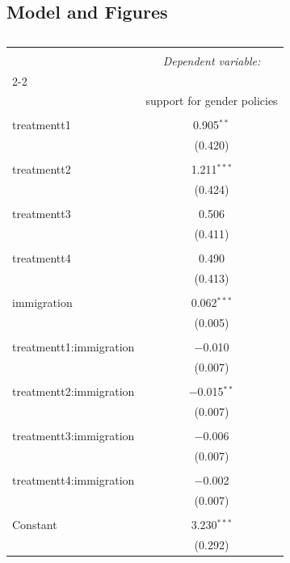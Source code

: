 \documentclass[12pt,letterpaper]{article}
\begin{document}
		\subsection*{Model and Figures}
		\begin{table}[!htbp] \centering 
			\caption{} 
			\label{} 
			\begin{tabular}{@{\extracolsep{5pt}}lc} 
				\\[-1.8ex]\hline 
				\hline \\[-1.8ex] 
				& \multicolumn{1}{c}{\textit{Dependent variable:}} \\ 
				\cline{2-2} 
				\\[-1.8ex] & support for gender policies \\ 
				\hline \\[-1.8ex] 
				treatmentt1 & 0.905$^{**}$ \\ 
				& (0.420) \\ 
				& \\ 
				treatmentt2 & 1.211$^{***}$ \\ 
				& (0.424) \\ 
				& \\ 
				treatmentt3 & 0.506 \\ 
				& (0.411) \\ 
				& \\ 
				treatmentt4 & 0.490 \\ 
				& (0.413) \\ 
				& \\ 
				immigration & 0.062$^{***}$ \\ 
				& (0.005) \\ 
				& \\ 
				treatmentt1:immigration & $-$0.010 \\ 
				& (0.007) \\ 
				& \\ 
				treatmentt2:immigration & $-$0.015$^{**}$ \\ 
				& (0.007) \\ 
				& \\ 
				treatmentt3:immigration & $-$0.006 \\ 
				& (0.007) \\ 
				& \\ 
				treatmentt4:immigration & $-$0.002 \\ 
				& (0.007) \\ 
				& \\ 
				Constant & 3.230$^{***}$ \\ 
				& (0.292) \\ 

\end{tabular}
\end{table}
\end{document}
